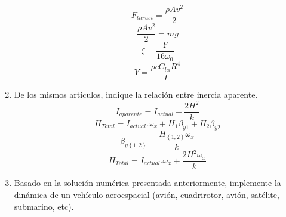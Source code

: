 \documentclass[12pt,oneside,spanish]{article}
\begin{document}
\begin{enumerate}
\begin{equation*}
    F_{thrust}=\frac{\rho A v^2}{2}
\end{equation*}
\begin{equation*}
    \frac{\rho A v^2}{2}=mg
\end{equation*}
\begin{equation*}
    \zeta=\frac{Y}{16 \omega_{0}}
\end{equation*}
\begin{equation*}
    Y=\frac{\rho cC_{l\alpha}R^4}{I}
\end{equation*}
\item De los mismos artículos, indique la relación entre inercia aparente.
\begin{equation*}
    I_{aparente}=I_{actual}+\frac{2H^2}{k}
\end{equation*}
\begin{equation*}
    H_{Total}=I_{actual}. \omega_{x}+H_{1}\beta_{y1}+H_{2}\beta_{y2}
\end{equation*}
\begin{equation*}
    \beta_{y\left\lbrace1,2\right\rbrace}=\frac{H_{\left\lbrace1,2\right\rbrace}\omega_{x}}{k}
\end{equation*}
\begin{equation*}
    H_{Total}=I_{actual}. \omega_{x}+\frac{2 H^2 \omega_{x}}{k}
\end{equation*}
\item Basado en la solución numérica presentada anteriormente, implemente la dinámica de un vehículo aeroespacial (avión, cuadrirotor, avión, satélite, submarino, etc).


\end{enumerate}
\end{document}
